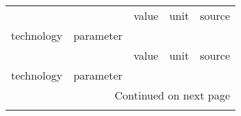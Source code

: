 \begin{longtable}{p{4cm}p{4cm}rp{3cm}p{10cm}}
\toprule
                      &            &        value &                          unit &                                                                                                                                                                                                                                                                                                                               source \\
technology & parameter &              &                               &                                                                                                                                                                                                                                                                                                                                      \\
\midrule
\endfirsthead

\toprule
                      &            &        value &                          unit &                                                                                                                                                                                                                                                                                                                               source \\
technology & parameter &              &                               &                                                                                                                                                                                                                                                                                                                                      \\
\midrule
\endhead
\midrule
\multicolumn{5}{r}{{Continued on next page}} \\
\midrule
\endfoot


\end{longtable}
